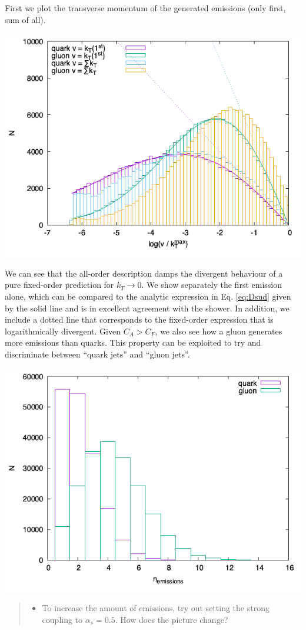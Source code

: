 \documentclass[11pt]{article}
\begin{document}
First we plot the transverse momentum of the generated emissions (only first, sum of all).
\begin{center}
\includegraphics[width=.9\linewidth]{plotKT.png}
\end{center}



We can see that the all-order description damps the divergent behaviour of a pure fixed-order prediction for \(k_T\to0\).
We show separately the first emission alone, which can be compared to the analytic expression in Eq. \eqref{eq:Dsud} given by the solid line and is in excellent agreement with the shower.
In addition, we include a dotted line that corresponds to the fixed-order expression that is logarithmically divergent.
Given \(C_A > C_F\), we also see how a gluon generates more emissions than quarks.
This property can be exploited to try and discriminate between ``quark jets'' and ``gluon jets''.


\begin{center}
\includegraphics[width=.9\linewidth]{plotN.png}
\end{center}




\begin{quote}
\begin{itemize}
\item To increase the amount of emissions, try out setting the strong coupling to \(\alpha_s=0.5\).
How does the picture change?
\end{itemize}
\end{quote}
\end{document}
